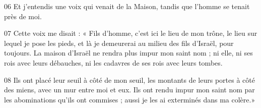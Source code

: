 
06 Et j’entendis une voix qui venait de la Maison, tandis que l’homme se tenait près de moi.

07 Cette voix me disait : « Fils d’homme, c’est ici le lieu de mon trône, le lieu sur lequel je pose les pieds, et là je demeurerai au milieu des fils d’Israël, pour toujours. La maison d’Israël ne rendra plus impur mon saint nom ; ni elle, ni ses rois avec leurs débauches, ni les cadavres de ses rois avec leurs tombes.

08 Ils ont placé leur seuil à côté de mon seuil, les montants de leurs portes à côté des miens, avec un mur entre moi et eux. Ils ont rendu impur mon saint nom par les abominations qu’ils ont commises ; aussi je les ai exterminés dans ma colère.»
